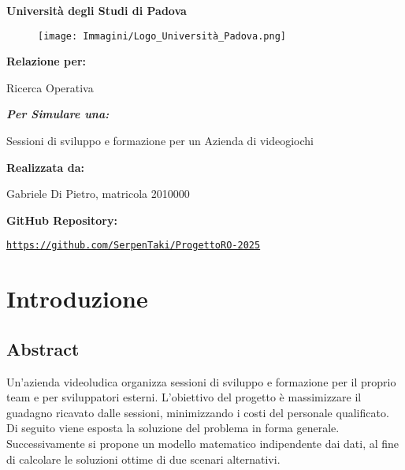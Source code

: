 \documentclass[12pt]{article}
\renewcommand{\familydefault}{\rmdefault} %
\begin{document}
\begin{titlepage}
    \centering
    {\Huge \textbf{Università degli Studi di Padova} \par}
    \vspace{1cm}
    \begin{figure}[h!]
        \centering
        \texttt{[image: Immagini/Logo\_Università\_Padova.png]}
    \end{figure}
    \vspace{0.5cm}
    {\LARGE \textbf{Relazione per:} \par}
    {\Huge Ricerca Operativa \par}
    \vspace{0.5cm}
    {\Large \textit{\textbf{Per Simulare una:}} \par}
    {\Large Sessioni di sviluppo e formazione per un Azienda di videogiochi \par}
    \vfill
    \textbf{Realizzata da:} \par
    Gabriele Di Pietro, matricola 2010000 \par
    \vspace{0.5cm}
    \textbf{GitHub Repository:} \par
    \texttt{\url{https://github.com/SerpenTaki/ProgettoRO-2025}}
\end{titlepage}
    \renewcommand{\familydefault}{\sfdefault} %
    \fontsize{10}{12}\selectfont
    \newpage
    \section{Introduzione}
    \subsection{Abstract}
    Un'azienda videoludica organizza sessioni di sviluppo e formazione per il proprio team e per sviluppatori esterni. L'obiettivo del progetto è massimizzare il guadagno ricavato dalle sessioni, minimizzando i costi del personale qualificato.
    Di seguito viene esposta la soluzione del problema in forma generale. Successivamente si propone un modello matematico indipendente dai dati, al fine di calcolare le soluzioni ottime di due scenari alternativi.
\end{document}
